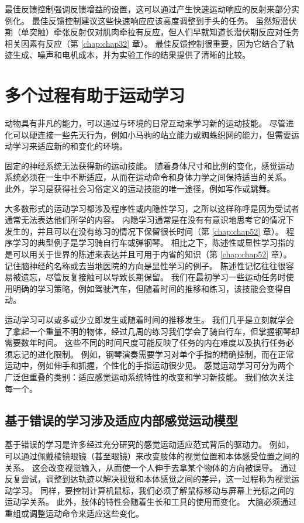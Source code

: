 最佳反馈控制强调反馈增益的设置，这可以通过产生快速运动响应的反射来部分实例化。 最佳反馈控制建议这些快速响应应该高度调整到手头的任务。 虽然短潜伏期（单突触）牵张反射仅对肌肉牵拉有反应，但人们早就知道长潜伏期反应对任务相关因素有反应（第 \ref{chap:chap32} 章）。 最佳反馈控制很重要，因为它结合了轨迹生成、噪声和电机成本，并为实验工作的结果提供了清晰的比较。



\section{多个过程有助于运动学习}
动物具有非凡的能力，可以通过与环境的日常互动来学习新的运动技能。 尽管进化可以硬连接一些先天行为，例如小马驹的站立能力或蜘蛛织网的能力，但需要运动学习来适应新的和变化的环境。

固定的神经系统无法获得新的运动技能。 随着身体尺寸和比例的变化，感觉运动系统必须在一生中不断适应，从而在运动命令和身体力学之间保持适当的关系。 此外，学习是获得社会习俗定义的运动技能的唯一途径，例如写作或跳舞。

大多数形式的运动学习都涉及程序性或内隐性学习，之所以这样称呼是因为受试者通常无法表达他们所学的内容。 内隐学习通常是在没有有意识地思考它的情况下发生的，并且可以在没有练习的情况下保留很长时间（第 \ref{chap:chap52} 章）。 程序学习的典型例子是学习骑自行车或弹钢琴。 相比之下，陈述性或显性学习指的是可以用关于世界的陈述来表达并且可用于内省的知识（第 \ref{chap:chap52} 章）。 记住脑神经的名称或去当地医院的方向是显性学习的例子。 陈述性记忆往往很容易被遗忘，尽管反复接触可以导致长期保留。 我们在最初学习一些运动任务时使用明确的学习策略，例如驾驶汽车，但随着时间的推移和练习，该技能会变得自动。

运动学习可以或多或少立即发生或随着时间的推移发生。 我们几乎是立刻就学会了拿起一个重量不明的物体，经过几周的练习我们学会了骑自行车，但掌握钢琴却需要数年时间。 这些不同的时间尺度可能反映了任务的内在难度以及执行任务必须忘记的进化限制。 例如，钢琴演奏需要学习对单个手指的精确控制，而在正常运动中，例如伸手和抓握，个性化的手指运动很少见。 感觉运动学习可分为两个广泛但重叠的类别：适应感觉运动系统特性的改变和学习新技能。 我们依次关注每一个。

\subsection{基于错误的学习涉及适应内部感觉运动模型}
基于错误的学习是许多经过充分研究的感觉运动适应范式背后的驱动力。 例如，可以通过佩戴棱镜眼镜（甚至眼镜）来改变肢体的视觉位置和本体感受位置之间的关系。 这会改变视觉输入，从而使一个人伸手去拿某个物体的方向被误导。 通过反复尝试，调整到达轨迹以解决视觉和本体感觉之间的差异，这一过程称为视觉运动学习。 同样，要控制计算机鼠标，我们必须了解鼠标移动与屏幕上光标之间的运动学关系。 此外，肢体的特性会随着生长和工具的使用而变化。 大脑必须通过重组或调整运动命令来适应这些变化。

